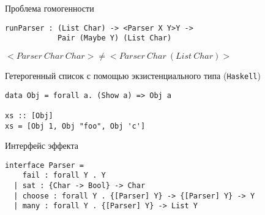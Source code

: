\begin{frame}[fragile]{Проблема гомогенности}
\begin{block}{}
\begin{verbatim}
runParser : (List Char) -> <Parser X Y>Y ->
            Pair (Maybe Y) (List Char)
\end{verbatim}
\end{block}
\pause
\begin{block}{}
$<Parser~Char~Char> \neq <Parser~Char~(List~Char)>$
\end{block}
\pause
\begin{block}{Гетерогенный список с помощью экзистенциального типа (\texttt{Haskell})}
\begin{verbatim}
data Obj = forall a. (Show a) => Obj a

xs :: [Obj]
xs = [Obj 1, Obj "foo", Obj 'c']
\end{verbatim}
\end{block}
\end{frame}



\begin{frame}[fragile]{}
\begin{block}{Интерфейс эффекта}
\begin{verbatim}
interface Parser =
    fail : forall Y . Y
  | sat : {Char -> Bool} -> Char
  | choose : forall Y . {[Parser] Y} -> {[Parser] Y} -> Y
  | many : forall Y . {[Parser] Y} -> List Y
\end{verbatim}
\end{block}
\end{frame}

